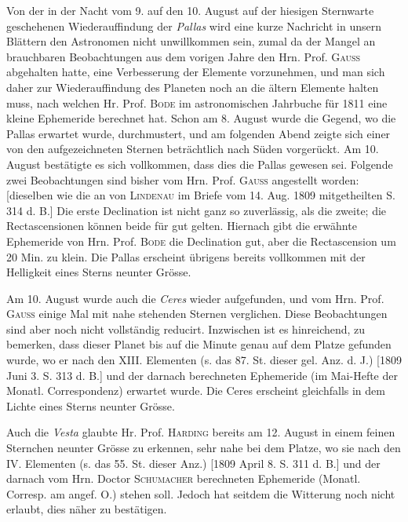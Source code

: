 \par\indent Von der in der Nacht vom 9. auf den 10. August auf der hiesigen Sternwarte geschehenen Wiederauffindung der \emph{Pallas} wird eine kurze Nachricht in unsern Blättern den Astronomen nicht unwillkommen sein, zumal da der Mangel an brauchbaren Beobachtungen aus dem vorigen Jahre den Hrn. Prof. \textsc{Gauss} abgehalten hatte, eine Verbesserung der Elemente vorzunehmen, und man sich daher zur Wiederauffindung des Planeten noch an die ältern Elemente halten muss, nach welchen Hr. Prof.
\textsc{Bode} im astronomischen Jahrbuche für 1811 eine kleine Ephemeride berechnet hat. Schon am 8. August wurde die Gegend, wo die Pallas erwartet wurde, durchmustert, und am folgenden Abend zeigte sich einer von den aufgezeichneten Sternen beträchtlich nach Süden vorgerückt. Am 10. August bestätigte es sich vollkommen, dass dies die Pallas gewesen sei. Folgende zwei Beobachtungen sind bisher vom Hrn. Prof. \textsc{Gauss} angestellt worden: [dieselben wie die an von \textsc{Lindenau} im Briefe vom 14. Aug. 1809 mitgetheilten S. 314 d. B.] Die erste Declination ist nicht ganz so zuverlässig, als die zweite; die Rectascensionen können beide für gut gelten. Hiernach gibt die erwähnte Ephemeride von Hrn. Prof. \textsc{Bode} die Declination gut, aber die Rectascension um 20 Min. zu klein. Die Pallas erscheint übrigens bereits vollkommen mit der Helligkeit eines Sterns neunter Grösse.

\par\indent Am 10. August wurde auch die \emph{Ceres} wieder aufgefunden, und vom Hrn. Prof. \textsc{Gauss} einige Mal mit nahe stehenden Sternen verglichen. Diese Beobachtungen sind aber noch nicht vollständig reducirt. Inzwischen ist es hinreichend, zu bemerken, dass dieser Planet bis auf die Minute genau auf dem Platze gefunden wurde, wo er nach den XIII. Elementen (s. das 87. St. dieser gel. Anz. d. J.) [1809 Juni 3. S. 313 d. B.] und der darnach berechneten Ephemeride (im Mai-Hefte der Monatl. Correspondenz) erwartet wurde. Die Ceres erscheint gleichfalls in dem Lichte eines Sterns neunter Grösse.

\par\indent Auch die \emph{Vesta} glaubte Hr. Prof. \textsc{Harding} bereits am 12. August in einem feinen Sternchen neunter Grösse zu erkennen, sehr nahe bei dem Platze, wo sie nach den IV. Elementen (s. das 55. St. dieser Anz.) [1809 April 8. S. 311 d. B.] und der darnach vom Hrn. Doctor \textsc{Schumacher} berechneten Ephemeride (Monatl. Corresp. am angef. O.) stehen soll. Jedoch hat seitdem die Witterung noch nicht erlaubt, dies näher zu bestätigen.

